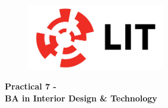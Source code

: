 

\newpage
\setcounter{page}{1}
\begin{center}
	\begin{figure}[ht]
		\centering
		\includegraphics[width = 6cm]{img/LITlogo.jpg}
		\label{fig:logoa7}
	\end{figure}
	\Large\textbf{Practical 7 - }\\
	\large\textbf{BA in Interior Design \& Technology}
\end{center}	

